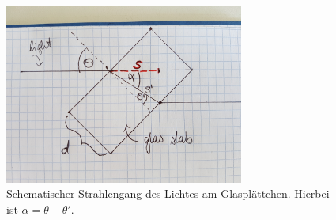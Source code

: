 \begin{figure}[htb]
  \centering
  \includegraphics[width=0.7\textwidth]{figures/glasslab.jpg}
  \caption{Schematischer Strahlengang des Lichtes am Glasplättchen. Hierbei ist $\alpha=\theta-\theta'$.}
  \label{fig:plättchen}
\end{figure}

